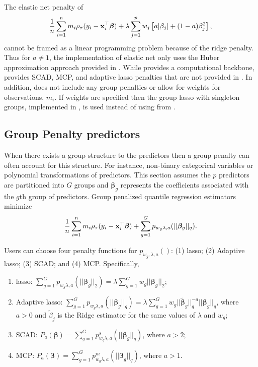 The elastic net penalty of
\begin{equation}
\frac{1}{n} \sum_{i=1}^n m_i \rho_\tau(y_i - {\bf x}_i^\top\bm \beta) + \lambda \sum_{j=1}^p w_j \left[ a|\beta_j|+(1-a)\beta_j^2\right],
\label{eq:enet}
\end{equation}
cannot be framed as a linear programming problem because of the ridge penalty. Thus for \(a \neq 1\), the  implementation of elastic net only uses the Huber approximation approach provided in . While  provides a computational backbone,  provides SCAD, MCP, and adaptive lasso penalties that are not provided in . In addition,  does not include any group penalties or allow for weights for observations, \(m_i\). If weights are specified then the group lasso with singleton groups, implemented in , is used instead of using  from .

\subsection{Group Penalty predictors}\label{group-penalty-predictors}

When there exists a group structure to the predictors then a group penalty can often account for this structure. For instance, non-binary categorical variables or polynomial transformations of predictors. This section assumes the \(p\) predictors are partitioned into \(G\) groups and \(\bm \beta_g\) represents the coefficients associated with the \(g\)th group of predictors. Group penalized quantile regression estimators minimize
\begin{equation}
\frac{1}{n} \sum_{i=1}^n m_i \rho_\tau(y_i - {\bf x}_i^\top\bm \beta) + \sum_{g=1}^G p_{w_g\lambda,a}(||\bm \beta_g||_q).
\label{eq:groupForm}
\end{equation}

Users can choose four penalty functions for \(p_{w_g,\lambda,a}()\): (1) lasso; (2) Adaptive lasso; (3) SCAD; and (4) MCP. Specifically,

\begin{enumerate}
\item lasso: $\sum_{g=1}^G p_{w_g\lambda,a}(||\bm \beta_g||_2)=\lambda \sum_{g=1}^G w_g ||\bm \beta_g||_2$;
\item Adaptive lasso: $\sum_{g=1}^G p_{w_g\lambda,a}(||\bm \beta_g||_q)= \lambda \sum_{g=1}^G w_g ||\tilde{\bm \beta}_g||_q^{-a} ||\bm \beta_g||_q$, where $a>0$ and $\tilde{\beta}_j$ is the Ridge estimator for the same values of $\lambda$ and $w_g$;
\item SCAD: $P_a(\bm \beta) = \sum_{g=1}^G p^s_{w_g\lambda,a}(||\bm \beta_g||_q)$, where $a>2$;
\item MCP: $P_a(\bm \beta) = \sum_{g=1}^G p^m_{w_g\lambda,a}(||\bm \beta_g||_q)$, where $a>1$.
\end{enumerate}

